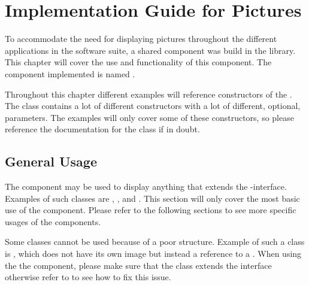 
\chapter{Implementation Guide for Pictures}
\label{cha:implementation_guide_for_pictures}

To accommodate the need for displaying pictures throughout the different applications in the \giraf software suite, a shared component was build in the \gc library. This chapter will cover the use and functionality of this component. The component implemented is named .


\begin{note}
    Throughout this chapter different examples will reference constructors of the . The class contains a lot of different constructors with a lot of different, optional, parameters. The examples will only cover some of these constructors, so please reference the documentation for the class if in doubt.
\end{note}

\section{General Usage}
\label{sec:general_usage}
The component may be used to display anything that extends the -interface. Examples of such classes are , , and . This section will only cover the most basic use of the component. Please refer to the following sections to see more specific usages of the components.


\begin{note}
    Some classes cannot be used because of a poor structure. Example of such a class is , which does not have its own image but instead a reference to a . When using the the component, please make sure that the class extends the  interface otherwise refer to  to see how to fix this issue.
\end{note}

